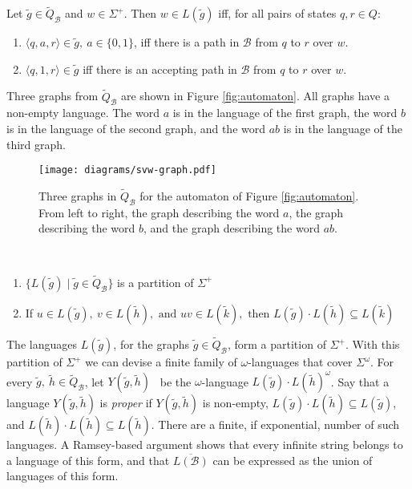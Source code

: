 \documentclass{LMCS}
\newcommand{\zug}[1]{\langle #1  \rangle}
\newcommand{\B}{{\mathcal B}}
\renewcommand{\graph}{\widetilde}
\newcommand{\Y}[2]{\ensuremath{Y({\graph{#1},\graph{#2}})}}
\begin{document}
\begin{defi}\label{X_Describes}
Let $\graph{g} \in \graph{Q}_\B$ and $w \in \Sigma^+$. Then $w \in L(\graph{g})$
iff, for all pairs of states $q, r \in Q$:
\begin{enumerate}[(1)]
\item $\zug{q,a,r} \in \graph{g},~ a \in \{0, 1\}$, iff there is a path in $\B$
from $q$ to $r$ over $w$.
\item $\zug{q,1,r} \in \graph{g}$ iff there is an accepting path in $\B$ from
$q$ to $r$ over $w$.
\end{enumerate} 
\end{defi}

\begin{exa}
Three graphs from $\graph{Q}_\B$ are shown in Figure \ref{fig:automaton}. All graphs have a
non-empty language. The word $a$ is in the language of the first graph, the word $b$ is in the
language of the second graph, and the word $ab$ is in the language of the third graph. 
\end{exa}

\begin{figure}[tb]
\begin{center}
{\texttt{[image: diagrams/svw-graph.pdf]}}
\end{center}
\caption{Three graphs in $\graph{Q}_\B$ for the automaton of Figure \ref{fig:automaton}. From left to
right, the graph describing the word $a$, the graph describing the word $b$, and the graph
describing the word $ab$.}  \label{fig:svw-graph}
\end{figure}

\begin{lem}\label{X_Partitions}{\rm \cite{Buc62,SVW85}}\  
\begin{enumerate}[\em(1)]
\item $\{L(\graph{g})\mid \graph{g} \in \graph{Q}_\B\}$ is a partition of
$\Sigma^+$
\item If $u \in L(\graph{g}),~ v \in L(\graph{h}),\text{ and }uv\in
L(\graph{k}), \text{ then } L(\graph{g}) \cdot L(\graph{h}) \subseteq
L(\graph{k})$
\end{enumerate}
\end{lem}

The languages $L(\graph{g})$, for the graphs $\graph{g} \in \graph{Q}_\B$, form
a partition of $\Sigma^+$. With this partition of $\Sigma^+$ we can devise a
finite family of $\omega$-languages that cover $\Sigma^\omega$. For every
$\graph{g},~ \graph{h} \in \graph{Q}_\B$, let $\Y{g}{h}$~ be the
$\omega$-language $L(\graph{g})\cdot L(\graph{h})^\omega$. Say that a language
$\Y{g}{h}$ is \emph{proper} if $\Y{g}{h}$ is non-empty, $L(\graph{g})\cdot
L(\graph{h}) \subseteq L(\graph{g})$, and $L(\graph{h})\cdot L(\graph{h})
\subseteq L(\graph{h})$.  There are a finite, if exponential, number of such
languages. A Ramsey-based argument shows that every infinite string belongs to
a language of this form, and that $\overline{L(\B)}$ can be expressed as the
union of languages of this form. 
\end{document}
